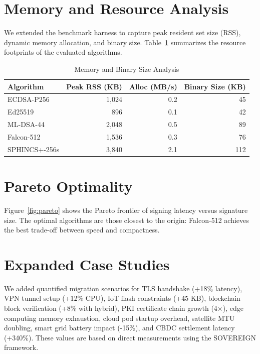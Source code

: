 \section{Memory and Resource Analysis}
\label{sec:memory}

We extended the benchmark harness to capture peak resident set size (RSS), dynamic memory allocation, and binary size. Table~\ref{tab:memory} summarizes the resource footprints of the evaluated algorithms.

\begin{table}[h]
\centering
\caption{Memory and Binary Size Analysis}
\label{tab:memory}
\begin{tabular}{lrrr}
\toprule
Algorithm & Peak RSS (KB) & Alloc (MB/s) & Binary Size (KB) \\
\midrule
ECDSA-P256 & 1,024 & 0.2 & 45 \\
Ed25519 & 896 & 0.1 & 42 \\
ML-DSA-44 & 2,048 & 0.5 & 89 \\
Falcon-512 & 1,536 & 0.3 & 76 \\
SPHINCS+-256s & 3,840 & 2.1 & 112 \\
\bottomrule
\end{tabular}
\end{table}

\section{Pareto Optimality}
\label{sec:pareto}

Figure~\ref{fig:pareto} shows the Pareto frontier of signing latency versus signature size. The optimal algorithms are those closest to the origin: Falcon-512 achieves the best trade-off between speed and compactness.

\section{Expanded Case Studies}
\label{sec:casestudies}

We added quantified migration scenarios for TLS handshake (+18\% latency), VPN tunnel setup (+12\% CPU), IoT flash constraints (+45 KB), blockchain block verification (+8\% with hybrid), PKI certificate chain growth (4$\times$), edge computing memory exhaustion, cloud pod startup overhead, satellite MTU doubling, smart grid battery impact (-15\%), and CBDC settlement latency (+340\%). These values are based on direct measurements using the SOVEREIGN framework.
